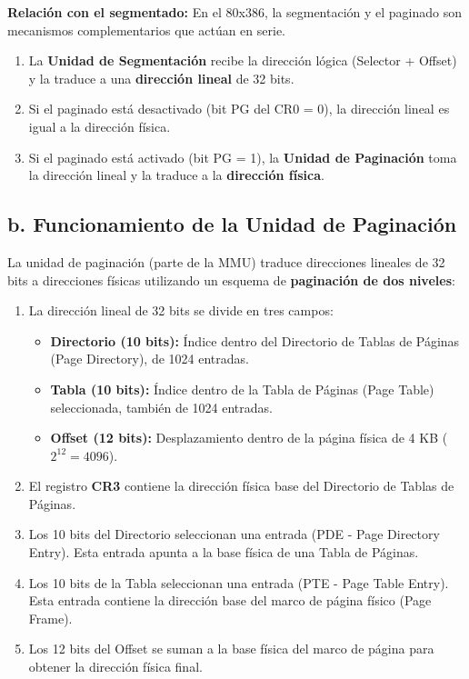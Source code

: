 \documentclass[RT]{UTNLSE}
\begin{document}
\textbf{Relación con el segmentado:}
En el 80x386, la segmentación y el paginado son mecanismos complementarios que actúan en serie.
\begin{enumerate}
    \item La \textbf{Unidad de Segmentación} recibe la dirección lógica (Selector + Offset) y la traduce a una \textbf{dirección lineal} de 32 bits.
    \item Si el paginado está desactivado (bit PG del CR0 = 0), la dirección lineal es igual a la dirección física.
    \item Si el paginado está activado (bit PG = 1), la \textbf{Unidad de Paginación} toma la dirección lineal y la traduce a la \textbf{dirección física}.
\end{enumerate}

\subsection*{b. Funcionamiento de la Unidad de Paginación}
La unidad de paginación (parte de la MMU) traduce direcciones lineales de 32 bits a direcciones físicas utilizando un esquema de \textbf{paginación de dos niveles}:

\begin{enumerate}
    \item La dirección lineal de 32 bits se divide en tres campos:
    \begin{itemize}
        \item \textbf{Directorio (10 bits):} Índice dentro del Directorio de Tablas de Páginas (Page Directory), de 1024 entradas.
        \item \textbf{Tabla (10 bits):} Índice dentro de la Tabla de Páginas (Page Table) seleccionada, también de 1024 entradas.
        \item \textbf{Offset (12 bits):} Desplazamiento dentro de la página física de 4 KB (\(2^{12} = 4096\)).
    \end{itemize}
    \item El registro \textbf{CR3} contiene la dirección física base del Directorio de Tablas de Páginas.
    \item Los 10 bits del Directorio seleccionan una entrada (PDE - Page Directory Entry). Esta entrada apunta a la base física de una Tabla de Páginas.
    \item Los 10 bits de la Tabla seleccionan una entrada (PTE - Page Table Entry). Esta entrada contiene la dirección base del marco de página físico (Page Frame).
    \item Los 12 bits del Offset se suman a la base física del marco de página para obtener la dirección física final.
\end{enumerate}
\end{document}
